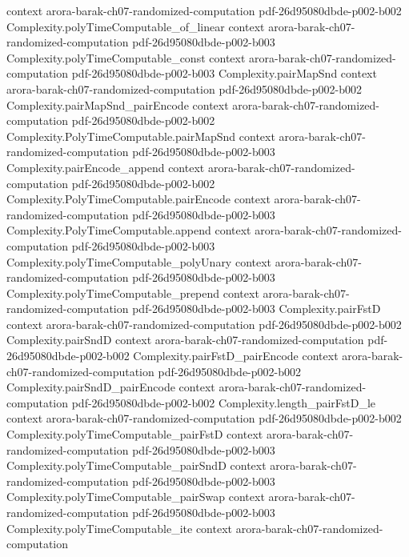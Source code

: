 \begin{theorem}
  {context}
  {arora-barak-ch07-randomized-computation}
  {pdf-26d95080dbde-p002-b002}
\proofstep
  {Complexity.polyTimeComputable_of_linear}
  {context}
  {arora-barak-ch07-randomized-computation}
  {pdf-26d95080dbde-p002-b003}
\proofstep
  {Complexity.polyTimeComputable_const}
  {context}
  {arora-barak-ch07-randomized-computation}
  {pdf-26d95080dbde-p002-b003}
\proofstep
  {Complexity.pairMapSnd}
  {context}
  {arora-barak-ch07-randomized-computation}
  {pdf-26d95080dbde-p002-b002}
\proofstep
  {Complexity.pairMapSnd_pairEncode}
  {context}
  {arora-barak-ch07-randomized-computation}
  {pdf-26d95080dbde-p002-b002}
\proofstep
  {Complexity.PolyTimeComputable.pairMapSnd}
  {context}
  {arora-barak-ch07-randomized-computation}
  {pdf-26d95080dbde-p002-b003}
\proofstep
  {Complexity.pairEncode_append}
  {context}
  {arora-barak-ch07-randomized-computation}
  {pdf-26d95080dbde-p002-b002}
\proofstep
  {Complexity.PolyTimeComputable.pairEncode}
  {context}
  {arora-barak-ch07-randomized-computation}
  {pdf-26d95080dbde-p002-b003}
\proofstep
  {Complexity.PolyTimeComputable.append}
  {context}
  {arora-barak-ch07-randomized-computation}
  {pdf-26d95080dbde-p002-b003}
\proofstep
  {Complexity.polyTimeComputable_polyUnary}
  {context}
  {arora-barak-ch07-randomized-computation}
  {pdf-26d95080dbde-p002-b003}
\proofstep
  {Complexity.polyTimeComputable_prepend}
  {context}
  {arora-barak-ch07-randomized-computation}
  {pdf-26d95080dbde-p002-b003}
\proofstep
  {Complexity.pairFstD}
  {context}
  {arora-barak-ch07-randomized-computation}
  {pdf-26d95080dbde-p002-b002}
\proofstep
  {Complexity.pairSndD}
  {context}
  {arora-barak-ch07-randomized-computation}
  {pdf-26d95080dbde-p002-b002}
\proofstep
  {Complexity.pairFstD_pairEncode}
  {context}
  {arora-barak-ch07-randomized-computation}
  {pdf-26d95080dbde-p002-b002}
\proofstep
  {Complexity.pairSndD_pairEncode}
  {context}
  {arora-barak-ch07-randomized-computation}
  {pdf-26d95080dbde-p002-b002}
\proofstep
  {Complexity.length_pairFstD_le}
  {context}
  {arora-barak-ch07-randomized-computation}
  {pdf-26d95080dbde-p002-b002}
\proofstep
  {Complexity.polyTimeComputable_pairFstD}
  {context}
  {arora-barak-ch07-randomized-computation}
  {pdf-26d95080dbde-p002-b003}
\proofstep
  {Complexity.polyTimeComputable_pairSndD}
  {context}
  {arora-barak-ch07-randomized-computation}
  {pdf-26d95080dbde-p002-b003}
\proofstep
  {Complexity.polyTimeComputable_pairSwap}
  {context}
  {arora-barak-ch07-randomized-computation}
  {pdf-26d95080dbde-p002-b003}
\proofstep
  {Complexity.polyTimeComputable_ite}
  {context}
  {arora-barak-ch07-randomized-computation}

\end{theorem}
